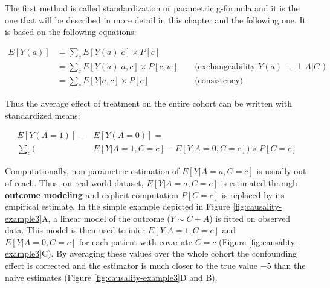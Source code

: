 \documentclass[a4paper,12pt,twoside,onecolumn,openright,final,oldfontcommands]{memoir}
\begin{document}
The first method is called standardization or parametric g-formula and
it is the one that will be described in more detail in this chapter and
the following one. It is based on the following equations:

\begin{equation*}
\begin{aligned}
  E[Y(a)] & = \sum_{c} E[Y(a)|c] \times P[c] \\
          & = \sum_{c} E[Y(a)|a,c] \times P[c,w]
          &&\text{ (exchangeability } Y(a) \perp \!\!\! \perp A | C \text{ )} \\
          & = \sum_{c} E[Y|a,c] \times P[c]
          &&\text{ (consistency)}
\end{aligned}
\end{equation*}

Thus the average effect of treatment on the entire cohort can be written
with standardized means:

\begin{equation}
\begin{aligned}
  E[Y(A=1)] - & E[Y(A=0)] = \\ 
   \sum_{c} \Big( & E[Y | A=1, C=c]-E[Y | A=0, C=c]\Big) \times P[C=c]
\end{aligned}
\end{equation}

Computationally, non-parametric estimation of \(E[Y | A=a, C=c]\) is
usually out of reach. Thus, on real-world dataset, \(E[Y | A=a, C=c]\)
is estimated through \textbf{outcome modeling} and explicit computation
\(P[C=c]\) is replaced by its empirical estimate. In the simple example
depicted in Figure \ref{fig:causality-example3}A, a linear model of the
outcome (\(Y\sim C+A\)) is fitted on observed data. This model is then
used to infer \(E[Y | A=1, C=c]\) and \(E[Y | A=0, C=c]\) for each
patient with covariate \(C=c\) (Figure \ref{fig:causality-example3}C).
By averaging these values over the whole cohort the confounding effect
is corrected and the estimator is much closer to the true value \(-5\)
than the naive estimates (Figure \ref{fig:causality-example3}D and B).
\end{document}
